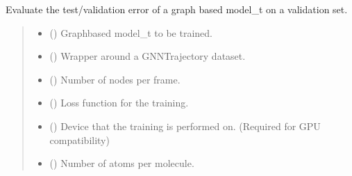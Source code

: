 \documentclass[a4paper,10pt,english]{report}
\begin{document}
\begin{fulllineitems}
\label{\detokenize{NNucleate:NNucleate.training.test_gnn}}
\pysigstartsignatures
{}
\pysigstopsignatures
\sphinxAtStartPar
Evaluate the test/validation error of a graph based model\_t on a validation set.
\begin{quote}\begin{description}
\begin{itemize}
\item {} 
\sphinxAtStartPar
{} ({\hyperref[\detokenize{NNucleate:NNucleate.models.GNNCV}]{}}) \textendash{} Graph\sphinxhyphen{}based model\_t to be trained.

\item {} 
\sphinxAtStartPar
{} () \textendash{} Wrapper around a GNNTrajectory dataset.

\item {} 
\sphinxAtStartPar
{} () \textendash{} Number of nodes per frame.

\item {} 
\sphinxAtStartPar
{} () \textendash{} Loss function for the training.

\item {} 
\sphinxAtStartPar
{} () \textendash{} Device that the training is performed on. (Required for GPU compatibility)

\item {} 
\sphinxAtStartPar
{} (\sphinxstyleliteralemphasis{\sphinxupquote{, }}) \textendash{} Number of atoms per molecule.


\end{itemize}
\end{description}
\end{quote}
\end{fulllineitems}
\end{document}
